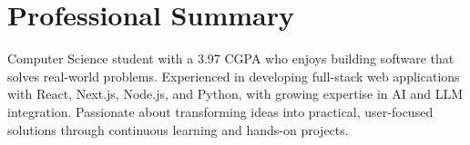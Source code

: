 \section*{Professional Summary}

Computer Science student with a 3.97 CGPA who enjoys building software that solves real-world problems. Experienced in developing full-stack web applications with React, Next.js, Node.js, and Python, with growing expertise in AI and LLM integration. Passionate about transforming ideas into practical, user-focused solutions through continuous learning and hands-on projects.
